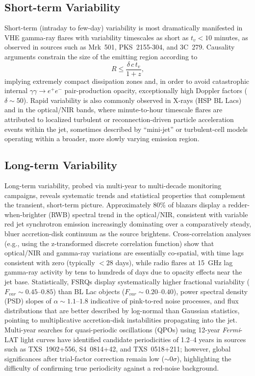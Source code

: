 \documentclass[11pt]{article}
\begin{document}
\subsection{Short-term Variability}

Short-term (intraday to few-day) variability is most dramatically manifested in VHE gamma-ray flares with variability timescales as short as $t_v < 10$ minutes, as observed in sources such as Mrk~501, PKS~2155-304, and 3C~279. Causality arguments constrain the size of the emitting region according to
\begin{equation}
R \le \frac{\delta\, c\, t_v}{1+z},
\end{equation}
implying extremely compact dissipation zones and, in order to avoid catastrophic internal $\gamma\gamma \to e^{+}e^{-}$ pair-production opacity, exceptionally high Doppler factors ($\delta \sim 50$). Rapid variability is also commonly observed in X-rays (HSP BL Lacs) and in the optical/NIR bands, where minute-to-hour timescale flares are attributed to localized turbulent or reconnection-driven particle acceleration events within the jet, sometimes described by ``mini-jet'' or turbulent-cell models operating within a broader, more slowly varying emission region.

\subsection{Long-term Variability}

Long-term variability, probed via multi-year to multi-decade monitoring campaigns, reveals systematic trends and statistical properties that complement the transient, short-term picture. Approximately 80\% of blazars display a redder-when-brighter (RWB) spectral trend in the optical/NIR, consistent with variable red jet synchrotron emission increasingly dominating over a comparatively steady, bluer accretion-disk continuum as the source brightens. Cross-correlation analyses (e.g., using the z-transformed discrete correlation function) show that optical/NIR and gamma-ray variations are essentially co-spatial, with time lags consistent with zero (typically $<28$ days), while radio flares at 15~GHz lag gamma-ray activity by tens to hundreds of days due to opacity effects near the jet base. Statistically, FSRQs display systematically higher fractional variability ($F_{var} \sim 0.45$--$0.85$) than BL Lac objects ($F_{var} \sim 0.20$--$0.40$), power spectral density (PSD) slopes of $\alpha \sim 1.1$--$1.8$ indicative of pink-to-red noise processes, and flux distributions that are better described by log-normal than Gaussian statistics, pointing to multiplicative accretion-disk instabilities propagating into the jet. Multi-year searches for quasi-periodic oscillations (QPOs) using 12-year \textit{Fermi}-LAT light curves have identified candidate periodicities of 1.2--4 years in sources such as TXS~1902+556, S4~0814+42, and TXS~0518+211; however, global significances after trial-factor correction remain low ($\sim 0\sigma$), highlighting the difficulty of confirming true periodicity against a red-noise background.
\end{document}
